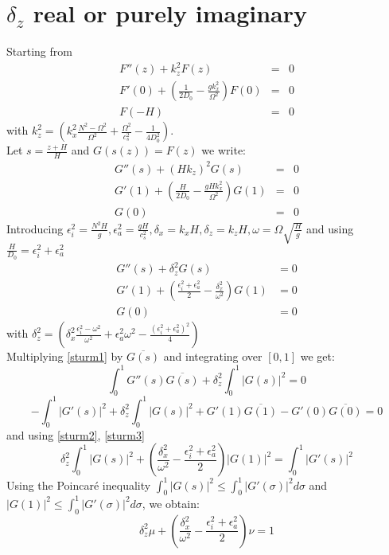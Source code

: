 \appendix
\section{$\delta_z$ real or purely imaginary}
\label{kzreal}
Starting from
\[
\begin{array}{rcl}
F''(z)
+
k_z^2
F(z)&=&0\\
\displaystyle
F'(0)+\left(
\frac{1}{2 D_0}-\frac{gk_x^2}{\Omega^2}
\right) F(0)&=&0\\[4mm]
\displaystyle
F(-H)&=&0
\end{array}
\]
with $\displaystyle k_z^2=\left(k_x^2\frac{N^2-\Omega^2}{\Omega^2}
+\frac{\Omega^2}{c_s^2}-\frac{1}{4D_0^2}\right)$.\\
Let $\displaystyle s=\frac{z+H}{H}$ and $G(s(z))=F(z)$ we write:
\[
\begin{array}{rcl}
G''(s)
+
(Hk_z)^2
G(s)&=&0\\
\displaystyle
G'(1)+\left(
\frac{H}{2 D_0}-\frac{gHk_x^2}{\Omega^2}
\right) G(1)&=&0\\[4mm]
\displaystyle
G(0)&=&0
\end{array}
\]
Introducing $\displaystyle \epsilon_i^2=\frac{N^2H}{g}, \epsilon_a^2=\frac{gH}{c_s^2},\delta_x=k_xH,\delta_z=k_zH,\omega=\Omega\sqrt{\frac{H}{g}}$ and using $\displaystyle \frac{H}{D_0}=\epsilon_i^2+\epsilon_a^2$
\begin{align}
G''(s)
+
\delta_z^2
G(s)&=0 \label{sturm1}\\
G'(1)+\left(
\frac{\epsilon_i^2+\epsilon_a^2}{2}-\frac{\delta_x^2}{\omega^2}
\right) G(1)&=0 \label{sturm2}\\
G(0)&=0 \label{sturm3}
\end{align}
with $\displaystyle \delta_z^2=\left(\delta_x^2\frac{\epsilon_i^2-\omega^2}{\omega^2}
+\epsilon_a^2\omega^2-\frac{(\epsilon_i^2+\epsilon_a^2)^2}{4}\right)$\\
Multiplying \ref{sturm1} by $\overline{G(s)}$ and integrating over $[0,1]$ we get:
\[
\int_0^1G''(s)\overline{G(s)}+\delta_z^2\int_0^1|G(s)|^2=0
\]
\[
-\int_0^1|G'(s)|^2+\delta_z^2\int_0^1|G(s)|^2+G'(1)\overline{G(1)}-G'(0)\overline{G(0)}=0
\]
and using \ref{sturm2}, \ref{sturm3}
\[
\delta_z^2 \int_0^1|G(s)|^2+\left(\frac{\delta_x^2}{\omega^2}-
\frac{\epsilon_i^2+\epsilon_a^2}{2}
\right)|G(1)|^2=\int_0^1|G'(s)|^2
\]
Using the Poincar\'e inequality $\displaystyle \int_0^1|G(s)|^2\le \int_{0}^1|G'(\sigma)|^2d\sigma$ and $\displaystyle |G(1)|^2 \le \int_{0}^1|G'(\sigma)|^2d\sigma$, we obtain:
\begin{equation}
\delta_z^2 \mu + \left(
\frac{\delta_x^2}{\omega^2}-\frac{\epsilon_i^2+\epsilon_a^2}{2}
\right)
\nu = 1
\label{sturm4}
\end{equation}
